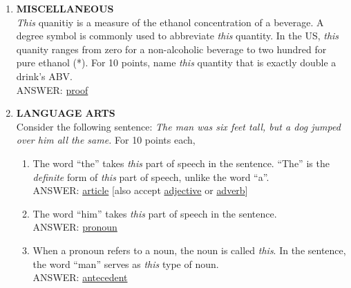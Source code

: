 \documentclass{report}
\newcommand*{\backtrack}{\setcounter{enumi}{\numexpr\theenumi-1\relax}}
\begin{document}
\begin{enumerate}
    \item \textbf{MISCELLANEOUS} \\ \textit{This} quanitiy is a measure of the ethanol concentration of a beverage. A degree symbol is commonly used to abbreviate \textit{this} quantity. In the US, \textit{this} quanity ranges from zero for a non-alcoholic beverage to two hundred for pure ethanol (*). For 10 points, name \textit{this} quantity that is exactly double a drink's ABV. \\ ANSWER: \underline{proof} \backtrack
    \item \textbf{LANGUAGE ARTS} \\ Consider the following sentence: \textit{The man was six feet tall, but a dog jumped over him all the same.} For 10 points each,
    \begin{enumerate}[label=\Alph*]
        \item The word ``the'' takes \textit{this} part of speech in the sentence. ``The'' is the \textit{definite} form of \textit{this} part of speech, unlike the word ``a''.\\ ANSWER: \underline{article} [also accept \underline{adjective} or \underline{adverb}]
        \item The word ``him'' takes \textit{this} part of speech in the sentence. \\ ANSWER: \underline{pronoun}
        \item When a pronoun refers to a noun, the noun is called \textit{this}. In the sentence, the word ``man'' serves as \textit{this} type of noun. \\ ANSWER: \underline{antecedent}
    \end{enumerate}


\end{enumerate}
\end{document}
